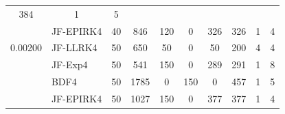 \begin{table}[htb]
\begin{adjustbox}{width=0.9\columnwidth,center}
\begin{tabular}{cccccccccc}
			384 & 1 & 5 \\
			\multicolumn{1}{l}{} & \multicolumn{1}{l}{JF-EPIRK4} & 40 & 846 & 120 & 0 &
			326 & 326 & 1 & 4 \\
			\multicolumn{1}{l}{0.00200} & \multicolumn{1}{l}{JF-LLRK4} & 50 & 650 & 50
			& 0 & 50 & 200 & 4 & 4 \\
			\multicolumn{1}{l}{} & \multicolumn{1}{l}{JF-Exp4} & 50 & 541 & 150 & 0 & 289
			& 291 & 1 & 8 \\
			\multicolumn{1}{l}{} & \multicolumn{1}{l}{BDF4} & 50 & 1785 & 0 & 150 & 0 &
			457 & 1 & 5 \\
			\multicolumn{1}{l}{} & \multicolumn{1}{l}{JF-EPIRK4} & 50 & 1027 & 150 & 0 &
			377 & 377 & 1 & 4 \\
			\hline
		\end{tabular}
	\end{adjustbox}
	\label{tab:br2d}
\end{table}

